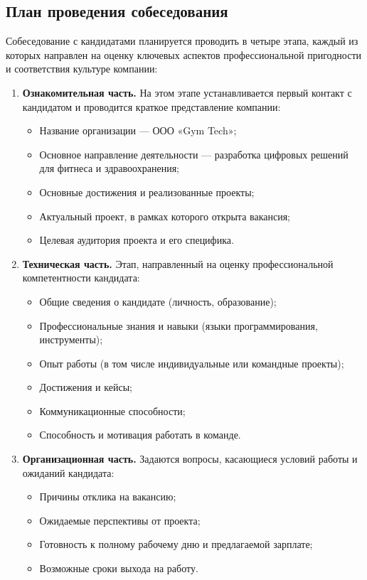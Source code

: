 \documentclass[14pt, russian]{matmex-diploma-custom}
\begin{document}
    \subsection{План проведения собеседования}

    Собеседование с кандидатами планируется проводить в четыре этапа, каждый из которых направлен на оценку ключевых аспектов профессиональной пригодности и соответствия культуре компании:

    \begin{enumerate}
        \item \textbf{Ознакомительная часть.}
        На этом этапе устанавливается первый контакт с кандидатом и проводится краткое представление компании:
        \begin{itemize}
            \item Название организации — ООО «Gym Tech»;
            \item Основное направление деятельности — разработка цифровых решений для фитнеса и здравоохранения;
            \item Основные достижения и реализованные проекты;
            \item Актуальный проект, в рамках которого открыта вакансия;
            \item Целевая аудитория проекта и его специфика.
        \end{itemize}

        \item \textbf{Техническая часть.}
        Этап, направленный на оценку профессиональной компетентности кандидата:
        \begin{itemize}
            \item Общие сведения о кандидате (личность, образование);
            \item Профессиональные знания и навыки (языки программирования, инструменты);
            \item Опыт работы (в том числе индивидуальные или командные проекты);
            \item Достижения и кейсы;
            \item Коммуникационные способности;
            \item Способность и мотивация работать в команде.
        \end{itemize}

        \item \textbf{Организационная часть.}
        Задаются вопросы, касающиеся условий работы и ожиданий кандидата:
        \begin{itemize}
            \item Причины отклика на вакансию;
            \item Ожидаемые перспективы от проекта;
            \item Готовность к полному рабочему дню и предлагаемой зарплате;
            \item Возможные сроки выхода на работу.
        \end{itemize}


\end{enumerate}
\end{document}
